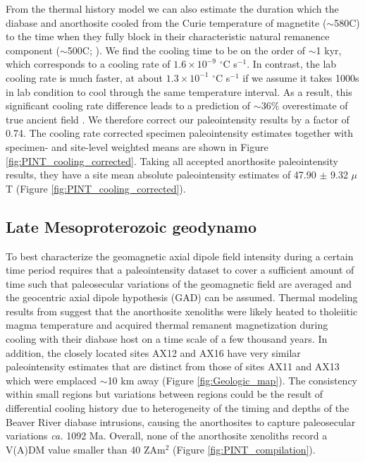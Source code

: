 \documentclass[draft]{agujournal2019}
\begin{document}
From the thermal history model we can also estimate the duration which the diabase and anorthosite cooled from the Curie temperature of magnetite ($\sim$580\textdegree C) to the time when they fully block in their characteristic natural remanence component ($\sim$500\textdegree C; ). We find the cooling time to be on the order of $\sim$1 kyr, which corresponds to a cooling rate of $1.6\times10^{-9}$ $^\circ$C s$^{-1}$. In contrast, the lab cooling rate is much faster, at about $1.3\times10^{-1}$ $^\circ$C s$^{-1}$ if we assume it takes 1000s in lab condition to cool through the same temperature interval. As a result, this significant cooling rate difference leads to a prediction of $\sim$36\% overestimate of true ancient field \cite{Halgedahl1980a}. We therefore correct our paleointensity results by a factor of 0.74. The cooling rate corrected specimen paleointensity estimates together with specimen- and site-level weighted means are shown in Figure \ref{fig:PINT_cooling_corrected}. Taking all accepted anorthosite paleointensity results, they have a site mean absolute paleointensity estimates of 47.90 $\pm$ 9.32 $\mu$T (Figure \ref{fig:PINT_cooling_corrected}). 


\subsection*{Late Mesoproterozoic geodynamo }
To best characterize the geomagnetic axial dipole field intensity during a certain time period requires that a paleointensity dataset to cover a sufficient amount of time such that paleosecular variations of the geomagnetic field are averaged and the geocentric axial dipole hypothesis (GAD) can be assumed. Thermal modeling results from  suggest that the anorthosite xenoliths were likely heated to tholeiitic magma temperature and acquired thermal remanent magnetization during cooling with their diabase host on a time scale of a few thousand years. In addition, the closely located sites AX12 and AX16 have very similar paleointensity estimates that are distinct from those of sites AX11 and AX13 which were emplaced $\sim$10 km away (Figure \ref{fig:Geologic_map}). The consistency within small regions but variations between regions could be the result of differential cooling history due to heterogeneity of the timing and depths of the Beaver River diabase intrusions, causing the anorthosites to capture paleosecular variations \textit{ca.} 1092 Ma. Overall, none of the anorthosite xenoliths record a V(A)DM value smaller than 40 ZAm$^2$ (Figure \ref{fig:PINT_compilation}). 
\end{document}
